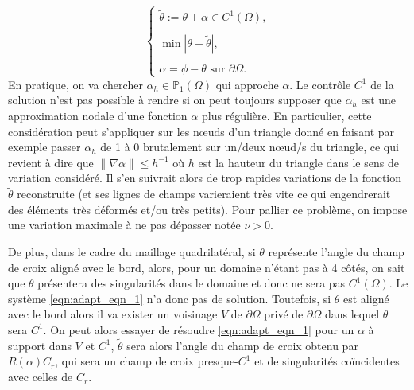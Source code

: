 \begin{equation}
\begin{cases}
    \tilde{\theta} := \theta + \alpha \in C^1(\Omega), \\\\
    \min \left\lvert \theta - \tilde{\theta} \right\rvert, \\\\
    \alpha = \phi - \theta \text{ sur } \partial\Omega.
\end{cases}
\label{eqn:adapt_eqn_1}
\end{equation}
En pratique, on va chercher $\alpha_h \in\mathbb{P}_1(\Omega)$ qui approche $\alpha$. Le contrôle $C^1$ de la solution n'est pas possible à rendre si on peut toujours supposer que $\alpha_h$ est une approximation nodale d'une fonction $\alpha$ plus régulière. En particulier, cette considération peut s'appliquer sur les nœuds d'un triangle donné en faisant par exemple passer $\alpha_h$ de 1 à 0 brutalement sur un/deux nœud/s du triangle, ce qui revient à dire que $\lVert \nabla\alpha \rVert \leq h^{-1}$ où $h$ est la hauteur du triangle dans le sens de variation considéré. Il s'en suivrait alors de trop rapides variations de la fonction $\tilde{\theta}$ reconstruite (et ses lignes de champs varieraient très vite ce qui engendrerait des éléments très déformés et/ou très petits). Pour pallier ce problème, on impose une variation maximale à ne pas dépasser notée $\nu > 0$.

De plus, dans le cadre du maillage quadrilatéral, si $\theta$ représente l’angle du champ de croix aligné avec le bord, alors, pour un domaine n’étant pas à 4 côtés, on sait que $\theta$ présentera des singularités dans le domaine et donc ne sera pas $C^1(\Omega)$. Le système \eqref{eqn:adapt_eqn_1} n’a donc pas de solution. Toutefois, si $\theta$ est aligné avec le bord alors il va exister un voisinage $V$ de $\partial\Omega$ privé de $\partial\Omega$ dans lequel $\theta$ sera $C^1$. On peut alors essayer de résoudre \eqref{eqn:adapt_eqn_1} pour un $\alpha$ à support dans $V$ et $C^1$, $\tilde{\theta}$ sera alors l’angle du champ de croix obtenu par $R(\alpha)C_r$, qui sera un champ de croix presque-$C^1$ et de singularités coïncidentes avec celles de $C_r$.

